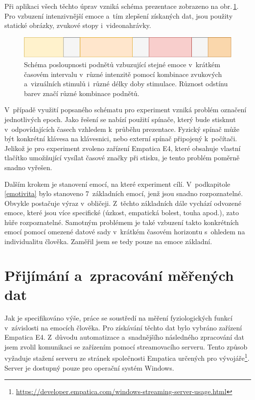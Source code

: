     Při aplikaci všech těchto úprav vzniká schéma prezentace zobrazeno na obr.\,\ref{fig:podnety_ruzna_intenzita}. Pro vzbuzení intenzivnější emoce a~tím zlepšení získaných dat, jsou použity statické obrázky, zvukové stopy i~videonahrávky.
    
    \begin{figure}[H]
        \centering
        \includegraphics[width=\textwidth]{obrazky-figures/podnety_ruzna_intenzita.png}
        \caption{Schéma posloupnosti podnětů vzbuzující stejné emoce v~krátkém časovém intervalu v~různé intenzitě pomocí kombinace zvukových a~vizuálních stimulů i~různé délky doby stimulace. Různost odstínu barev značí různé kombinace podnětů.}
        \label{fig:podnety_ruzna_intenzita}
    \end{figure}
    
    V~případě využití popsaného schématu pro experiment vzniká problém označení jednotlivých epoch. Jako řešení se nabízí použití spínače, který bude stisknut v~odpovídajících časech vzhledem k~průběhu prezentace. Fyzický spínač může být konkrétní klávesa na klávesnici, nebo externí spínač připojený k~počítači. Jelikož je pro experiment zvoleno zařízení Empatica E4, které obsahuje vlastní tlačítko umožňující vysílat časové značky při stisku, je tento problém poměrně snadno vyřešen.
    
    \vspace{3mm}
    
    Dalším krokem je stanovení emocí, na které experiment cílí. V~podkapitole \ref{emotivita} bylo stanoveno 7~základních emocí, jenž jsou snadno rozpoznatelné. Obvykle postačuje výraz v~obličeji. Z~těchto základních dále vychází odvozené emoce, které jsou více specifické (úzkost, empatická bolest, touha apod.), zato hůře rozpoznatelné. Samotným problémem je také vzbuzení takto konkrétních emocí pomocí omezené datové sady v~krátkém časovém horizontu s~ohledem na individualitu člověka. Zaměřil jsem se tedy pouze na emoce základní.
    
    
    \section{Přijímání a~zpracování měřených dat}
    Jak je specifikováno výše, práce se soustředí na měření fyziologických funkcí v~závislosti na emocích člověka. Pro získávání těchto dat bylo vybráno zařízení Empatica E4. Z~důvodu automatizace a~snadnějšího následného zpracování dat jsem zvolil komunikaci se zařízením pomocí streamovacího serveru. Tento způsob vyžaduje stažení serveru ze stránek společnosti Empatica určených pro vývojáře\footnote{\url{https://developer.empatica.com/windows-streaming-server-usage.html}}. Server je dostupný pouze pro operační systém Windows. 
    
